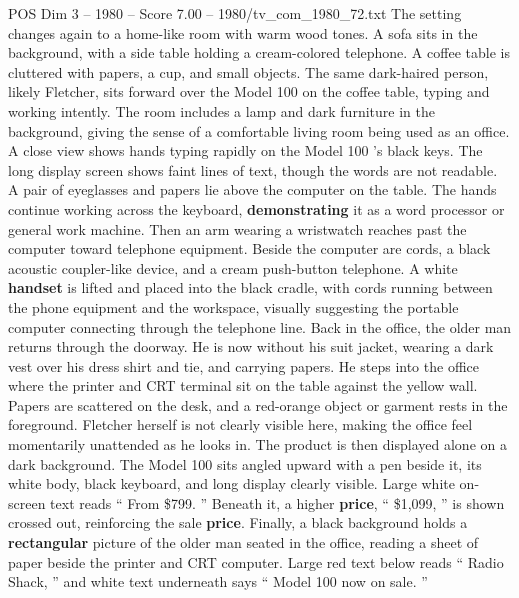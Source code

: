 \begin{textsample}{POS Dim 3 – 1980 – Score 7.00 – 1980/tv\_com\_1980\_72.txt}
The setting changes again to a home-like room with warm wood tones.
A sofa sits in the background, with a side table holding a cream-colored telephone.
A coffee table is cluttered with papers, a cup, and small objects.
The same dark-haired person, likely Fletcher, sits forward over the Model 100 on the coffee table, typing and working intently.
The room includes a lamp and dark furniture in the background, giving the sense of a comfortable living room being used as an office.
A close view shows hands typing rapidly on the Model 100 ’s black keys.
The long display screen shows faint lines of text, though the words are not readable.
A pair of eyeglasses and papers lie above the computer on the table.
The hands continue working across the keyboard, \textbf{demonstrating} it as a word processor or general work machine.
Then an arm wearing a wristwatch reaches past the computer toward telephone equipment.
Beside the computer are cords, a black acoustic coupler-like device, and a cream push-button telephone.
A white \textbf{handset} is lifted and placed into the black cradle, with cords running between the phone equipment and the workspace, visually suggesting the portable computer connecting through the telephone line.
Back in the office, the older man returns through the doorway.
He is now without his suit jacket, wearing a dark vest over his dress shirt and tie, and carrying papers.
He steps into the office where the printer and CRT terminal sit on the table against the yellow wall.
Papers are scattered on the desk, and a red-orange object or garment rests in the foreground.
Fletcher herself is not clearly visible here, making the office feel momentarily unattended as he looks in.
The product is then displayed alone on a dark background.
The Model 100 sits angled upward with a pen beside it, its white body, black keyboard, and long display clearly visible.
Large white on-screen text reads “ From \$799. ” Beneath it, a higher \textbf{price}, “ \$1,099, ” is shown crossed out, reinforcing the sale \textbf{price}.
Finally, a black background holds a \textbf{rectangular} picture of the older man seated in the office, reading a sheet of paper beside the printer and CRT computer.
Large red text below reads “ Radio Shack, ” and white text underneath says “ Model 100 now on sale. ”

\end{textsample}
